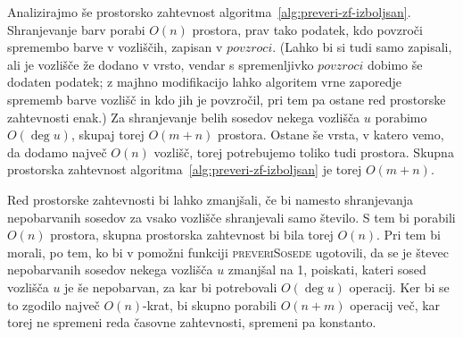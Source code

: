 \documentclass[12pt,a4paper,twoside]{article}
\theoremstyle{definition} %
\theoremstyle{plain} %
\numberwithin{equation}{section}  %
\begin{document}
Analizirajmo še prostorsko zahtevnost algoritma~\ref{alg:preveri-zf-izboljsan}. Shranjevanje barv porabi $O(n)$ prostora, prav tako podatek, kdo povzroči spremembo barve v vozliščih, zapisan v $povzroci$. (Lahko bi si tudi samo zapisali, ali je vozlišče že dodano v vrsto, vendar s spremenljivko $povzroci$ dobimo še dodaten podatek; z majhno modifikacijo lahko algoritem vrne zaporedje sprememb barve vozlišč in kdo jih je povzročil, pri tem pa ostane red prostorske zahtevnosti enak.) Za shranjevanje belih sosedov nekega vozlišča $u$ porabimo $O(\deg u)$, skupaj torej $O(m+n)$ prostora. Ostane še vrsta, v katero vemo, da dodamo največ $O(n)$ vozlišč, torej potrebujemo toliko tudi prostora. Skupna prostorska zahtevnost algoritma~\ref{alg:preveri-zf-izboljsan} je torej $O(m+n)$.

Red prostorske zahtevnosti bi lahko zmanjšali, če bi namesto shranjevanja nepobarvanih sosedov za vsako vozlišče shranjevali samo število. S tem bi porabili $O(n)$ prostora, skupna prostorska zahtevnost bi bila torej $O(n)$. Pri tem bi morali, po tem, ko bi v pomožni funkciji \textsc{preveriSosede} ugotovili, da se je števec nepobarvanih sosedov nekega vozlišča $u$ zmanjšal na 1, poiskati, kateri sosed vozlišča $u$ je še nepobarvan, za kar bi potrebovali $O(\deg u)$ operacij. Ker bi se to zgodilo največ $O(n)$-krat, bi skupno porabili $O(n+m)$ operacij več, kar torej ne spremeni reda časovne zahtevnosti, spremeni pa konstanto.
\end{document}
